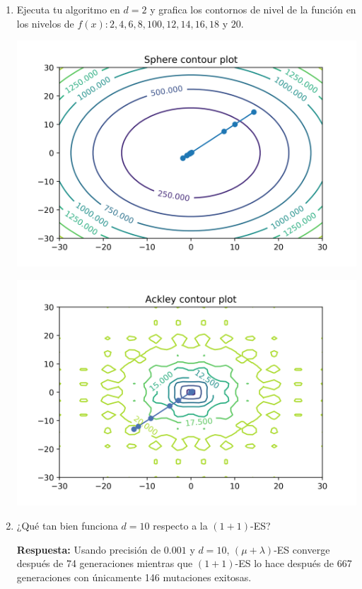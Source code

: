 \documentclass[10pt,letterpaper]{article}
\begin{document}
\begin{enumerate}
        \begin{enumerate}
            \item Ejecuta tu algoritmo en $d=2$ y grafica los contornos de nivel de
                la función en los nivelos de $f(x): 2, 4, 6, 8, 100, 12, 14, 16, 18$ y $20$.
                \begin{center}
                    \includegraphics[scale=.6]{./assets/ex3-a-sphere.png}
                \end{center}
                \begin{center}
                    \includegraphics[scale=.6]{./assets/ex3-a-ackley.png}
                \end{center}
            \clearpage
            \item ¿Qué tan bien funciona $d=10$ respecto a la $(1+1)$-ES?

            \textbf{Respuesta:} Usando precisión de $0.001$ y $d=10$, $(\mu + \lambda)$-ES
            converge después de 74 generaciones mientras que $(1+1)$-ES lo hace después de
            667 generaciones con únicamente 146 mutaciones exitosas.


\end{enumerate}
\end{enumerate}
\end{document}
